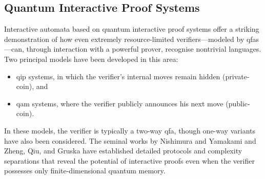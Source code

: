 \subsection{Quantum Interactive Proof Systems}
\label{sec:interactive-automata}

Interactive automata based on quantum interactive proof systems offer a striking demonstration of how even extremely resource-limited verifiers—modeled by \glspl{qfa}—can, through interaction with a powerful prover, recognise nontrivial languages. Two principal models have been developed in this area:
  
\begin{itemize}
  \item \gls{qip} systems, in which the verifier's internal moves remain hidden (private-coin), and
  \item \gls{qam} systems, where the verifier publicly announces his next move (public-coin).
\end{itemize}

In these models, the verifier is typically a two-way qfa, though one-way variants have also been considered. The seminal works by Nishimura and Yamakami \cite{nishimura2009application, nishimura2015interactive} and Zheng, Qiu, and Gruska \cite{zheng2015power} have established detailed protocols and complexity separations that reveal the potential of interactive proofs even when the verifier possesses only finite-dimensional quantum memory.

